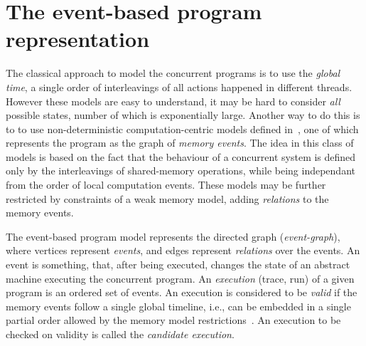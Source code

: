 

\section{The event-based program representation}
\label{ch:wmm:event}



The classical approach to model the concurrent programs is to use the \textit{global time}, a single order of interleavings of all actions happened in different threads. However these models are easy to understand, it may be hard to consider \textit{all} possible states, number of which is exponentially large. Another way to do this is to to use non-deterministic computation-centric models defined in~\cite{fri97}, one of which represents the program as the graph of \textit{memory events}. The idea in this class of models is based on the fact that the behaviour of a concurrent system is defined only by the interleavings of shared-memory operations, while being independant from the order of local computation events. These models may be further restricted by constraints of a weak memory model, adding \textit{relations} to the memory events.

The event-based program model represents the directed graph (\textit{event-graph}), where vertices represent \textit{events}, and edges represent \textit{relations} over the events. An event is something, that, after being executed, changes the state of an abstract machine executing the concurrent program. 
An \textit{execution} (trace, run) of a given program is an ordered set of events.
An execution is considered to be \textit{valid} if the memory events follow a single global timeline, i.e., can be embedded in a single partial order allowed by the memory model restrictions~\cite{alglave2010shared}. An execution to be checked on validity is called the \textit{candidate execution}.

